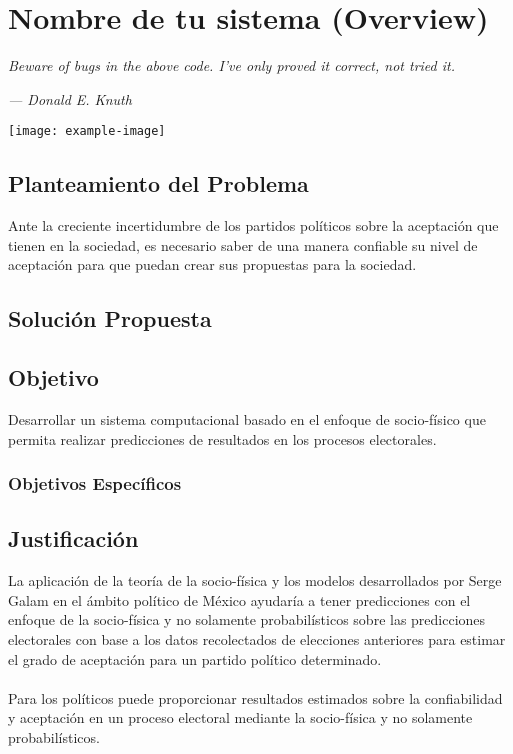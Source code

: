 \chapter{Nombre de tu sistema (Overview)}
\epigraph{\textit{Beware of bugs in the above code. I've only proved it correct, not tried it.     
	}}{\textit{—  Donald E. Knuth}}
	\vspace*{8cm}
	\begin{center}
		\centering %
		\texttt{[image: example-image]}
	\end{center}
	\thispagestyle{empty}
	\newpage
	\vspace*{2cm}
\section{Planteamiento del Problema}
Ante la creciente incertidumbre de los partidos políticos sobre la aceptación que tienen en la sociedad, es necesario saber de una manera confiable su nivel de aceptación para que puedan crear sus propuestas para la sociedad.

\section{Solución Propuesta}
\blindmathpaper 

\section{Objetivo}
Desarrollar un sistema computacional basado en el enfoque de socio-físico que permita realizar predicciones de resultados en los procesos electorales. 

\subsection{Objetivos Específicos}
\blindenumerate[15]


\section{Justificación}
La aplicación de la teoría de la socio-física y los modelos desarrollados por Serge Galam en el ámbito político de México ayudaría a tener predicciones con el enfoque de la socio-física y no solamente probabilísticos sobre las predicciones electorales con base a los datos recolectados de elecciones anteriores para estimar el grado de aceptación para un partido político determinado.
\\
\\
Para los políticos puede proporcionar resultados estimados sobre la confiabilidad y aceptación en un proceso electoral mediante la socio-física y no solamente probabilísticos.


